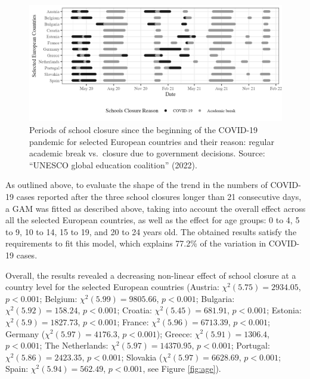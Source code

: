 \documentclass[unnumsec,webpdf,contemporary,large]{oup-authoring-template}%
\theoremstyle{thmstyleone}%
\theoremstyle{thmstyletwo}%
\theoremstyle{thmstylethree}%
\begin{document}
\begin{figure}
\includegraphics[width=\textwidth]{manuscript_files/figure-latex/descriptive-1} \caption{Periods of school closure since the beginning of the COVID-19 pandemic for selected European countries and their reason: regular academic break vs.~closure due to government decisions. Source: {``{UNESCO} global education coalition''} (2022).}\label{fig:descriptive}
\end{figure}

As outlined above, to evaluate the shape of the trend in the numbers of COVID-19 cases reported after the three school closures longer than 21 consecutive days, a GAM was fitted as described above, taking into account the overall effect across all the selected European countries, as well as the effect for age groups: 0 to 4, 5 to 9, 10 to 14, 15 to 19, and 20 to 24 years old. The obtained results satisfy the requirements to fit this model, which explains 77.2\% of the variation in COVID-19 cases.

Overall, the results revealed a decreasing non-linear effect of school closure at a country level for the selected European countries (Austria: \(\chi^2(5.75) = 2934.05\), \(p < 0.001\); Belgium: \(\chi^2(5.99) = 9805.66\), \(p < 0.001\); Bulgaria: \(\chi^2(5.92) = 158.24\), \(p < 0.001\); Croatia: \(\chi^2(5.45) = 681.91\), \(p < 0.001\); Estonia: \(\chi^2(5.9) = 1827.73\), \(p < 0.001\); France: \(\chi^2(5.96) = 6713.39\), \(p < 0.001\); Germany (\(\chi^2(5.97) = 4176.3\), \(p < 0.001\)); Greece: \(\chi^2(5.91) = 1306.4\), \(p < 0.001\); The Netherlands: \(\chi^2(5.97) = 14370.95\), \(p < 0.001\); Portugal: \(\chi^2(5.86) = 2423.35\), \(p < 0.001\); Slovakia (\(\chi^2(5.97) = 6628.69\), \(p < 0.001\); Spain: \(\chi^2(5.94) = 562.49\), \(p < 0.001\), see Figure \ref{fig:age}).
\end{document}
